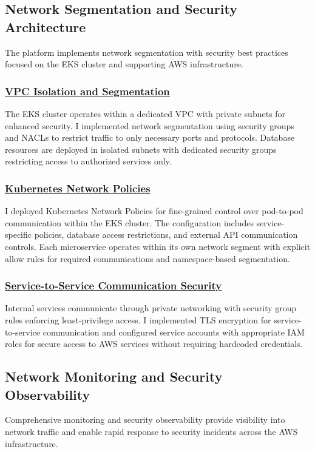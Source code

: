 \subsection{Network Segmentation and Security Architecture}
The platform implements network segmentation with security best practices focused on the EKS cluster and supporting AWS infrastructure.

\subsubsection*{\underline{VPC Isolation and Segmentation}}
The EKS cluster operates within a dedicated VPC with private subnets for enhanced security. I implemented network segmentation using security groups and NACLs to restrict traffic to only necessary ports and protocols. Database resources are deployed in isolated subnets with dedicated security groups restricting access to authorized services only.

\subsubsection*{\underline{Kubernetes Network Policies}}
I deployed Kubernetes Network Policies for fine-grained control over pod-to-pod communication within the EKS cluster. The configuration includes service-specific policies, database access restrictions, and external API communication controls. Each microservice operates within its own network segment with explicit allow rules for required communications and namespace-based segmentation.

\subsubsection*{\underline{Service-to-Service Communication Security}}
Internal services communicate through private networking with security group rules enforcing least-privilege access. I implemented TLS encryption for service-to-service communication and configured service accounts with appropriate IAM roles for secure access to AWS services without requiring hardcoded credentials.

\subsection{Network Monitoring and Security Observability}
Comprehensive monitoring and security observability provide visibility into network traffic and enable rapid response to security incidents across the AWS infrastructure.

